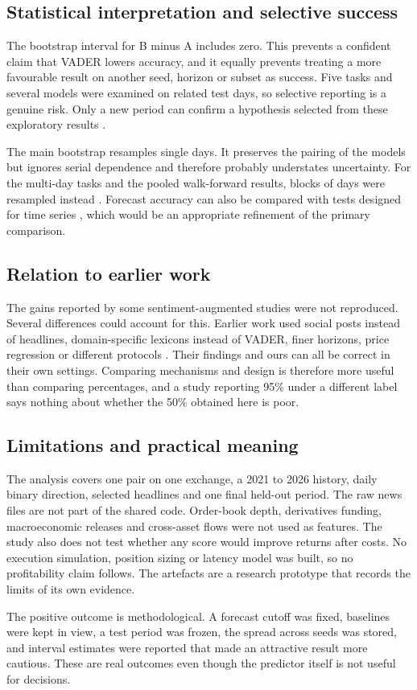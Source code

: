 \subsection{Statistical interpretation and selective success}
The bootstrap interval for B minus A includes zero. This prevents a confident claim that VADER lowers accuracy, and it equally prevents treating a more favourable result on another seed, horizon or subset as success. Five tasks and several models were examined on related test days, so selective reporting is a genuine risk. Only a new period can confirm a hypothesis selected from these exploratory results \cite{bailey2014}.

The main bootstrap resamples single days. It preserves the pairing of the models but ignores serial dependence and therefore probably understates uncertainty. For the multi-day tasks and the pooled walk-forward results, blocks of days were resampled instead \cite{kunsch1989,politis1994}. Forecast accuracy can also be compared with tests designed for time series \cite{diebold1995}, which would be an appropriate refinement of the primary comparison.

\subsection{Relation to earlier work}
The gains reported by some sentiment-augmented studies were not reproduced. Several differences could account for this. Earlier work used social posts instead of headlines, domain-specific lexicons instead of VADER, finer horizons, price regression or different protocols \cite{huang2021,seabe2025,nezhad2026}. Their findings and ours can all be correct in their own settings. Comparing mechanisms and design is therefore more useful than comparing percentages, and a study reporting 95\% under a different label says nothing about whether the 50\% obtained here is poor.

\subsection{Limitations and practical meaning}
The analysis covers one pair on one exchange, a 2021 to 2026 history, daily binary direction, selected headlines and one final held-out period. The raw news files are not part of the shared code. Order-book depth, derivatives funding, macroeconomic releases and cross-asset flows were not used as features. The study also does not test whether any score would improve returns after costs. No execution simulation, position sizing or latency model was built, so no profitability claim follows. The artefacts are a research prototype that records the limits of its own evidence.

The positive outcome is methodological. A forecast cutoff was fixed, baselines were kept in view, a test period was frozen, the spread across seeds was stored, and interval estimates were reported that made an attractive result more cautious. These are real outcomes even though the predictor itself is not useful for decisions.
